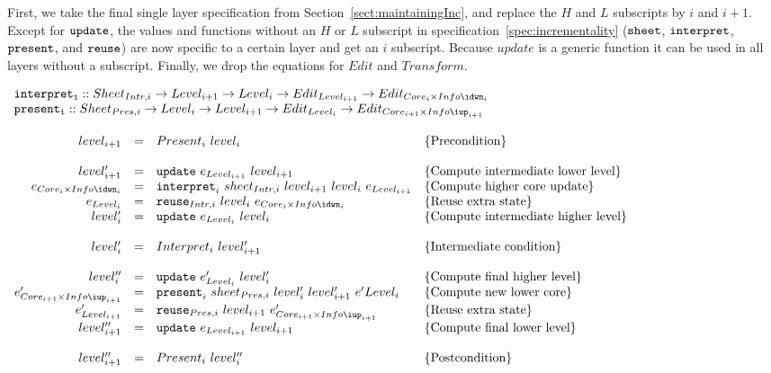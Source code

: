First, we take the  final single layer specification from Section~\ref{sect:maintainingInc}, and replace the $H$ and $L$ subscripts by $i$ and $i+1$. Except for ${\tt update}$, the values and functions without an $H$ or $L$ subscript in specification~\ref{spec:incrementality} (${\tt sheet}$, ${\tt interpret}$, ${\tt present}$, and
 ${\tt reuse}$) are now specific to a certain layer and get an $i$ subscript. Because $update$ is a generic function it can be used in all layers without a subscript. Finally, we drop the equations for $Edit$ and $Transform$.

\begin{small}
 \label{spec:combinationFirstAttempt}
\( \begin{array}{lcl}
{\tt interpret_i}  ::  Sheet_{Intr,i} \rightarrow Level_{i+1} \rightarrow Level_{i} \rightarrow  Edit_{Level_{i+1}} \rightarrow Edit_{Core_{i}\times Info\idwn_{i}} \\
{\tt present_i}  ::  Sheet_{Pres,i} \rightarrow Level_{i} \rightarrow Level_{i+1}  \rightarrow Edit_{Level_{i}} \rightarrow Edit_{Core_{i+1}\times Info\iup_{i+1}}\\
\\
\end{array}\) \\
\( \begin{array}{rcll}  
level_{i+1} 	& = & Present_{i}~level_{i}						& \text{\{Precondition\}}\\
\\
level'_{i+1} 	& = & {\tt update}~e_{Level_{i+1}}~level_{i+1}                 & \text{\{Compute intermediate lower level\}}\\
e_{Core_{i} \times Info\idwn_{i}}  & = & {\tt interpret}_{i}~sheet_{Intr,i}~level_{i+1}~level_{i}~e_{Level_{i+1}} & \text{\{Compute higher core update\}}\\
e_{Level_{i}} & = & {\tt reuse}_{Intr,i}~level_{i}~e_{Core_{i}\times Info\idwn_{i}}     & \text{\{Reuse extra state\}}\\
level'_{i} & = & {\tt update}~e_{Level_{i}}~level_{i}                 & \text{\{Compute intermediate higher level\}}\\
\\\
level'_{i} & = & Interpret_{i}~level'_{i+1}						& \text{\{Intermediate condition\}}\\
\\
level''_{i} & = & {\tt update}~e'_{Level_{i}}~level'_{i}                 & \text{\{Compute final higher level\}}\\
e'_{Core_{i+1}\times Info\iup_{i+1}}  & = & {\tt present}_{i}~sheet_{Pres,i}~level'_{i}~level'_{i+1}~e'{Level_{i}} & \text{\{Compute new lower core\}}\\
e'_{Level_{i+1}} & = & {\tt reuse}_{Pres,i}~level_{i+1}~e'_{Core_{i+1}\times Info\iup_{i+1}} & \text{\{Reuse extra state\}}\\
level''_{i+1} & = & {\tt update}~e_{Level_{i+1}}~level_{i+1}                 & \text{\{Compute final lower level\}}\\
\\
level''_{i+1} & = & Present_{i}~level''_{i}						& \text{\{Postcondition\}}\\
\end{array}\)
\end{small}
